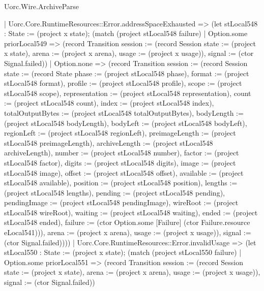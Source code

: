 \begin{lexlean}{Uorc.Wire.ArchiveParse}
\begin{semanticmodule}
{      | Uorc.Core.RuntimeResources::Error.addressSpaceExhausted => (let stLocal548 : State := (project x state); (match (project stLocal548 failure)
        | Option.some priorLocal549 => (record Transition {session := (record Session {state := (project x state), arena := (project x arena), usage := (project x usage)}), signal := (ctor Signal.failed)})
        | Option.none => (record Transition {session := (record Session {state := (record State {phase := (project stLocal548 phase), format := (project stLocal548 format), profile := (project stLocal548 profile), scope := (project stLocal548 scope), representation := (project stLocal548 representation), count := (project stLocal548 count), index := (project stLocal548 index), totalOutputBytes := (project stLocal548 totalOutputBytes), bodyLength := (project stLocal548 bodyLength), bodyLeft := (project stLocal548 bodyLeft), regionLeft := (project stLocal548 regionLeft), preimageLength := (project stLocal548 preimageLength), archiveLength := (project stLocal548 archiveLength), number := (project stLocal548 number), factor := (project stLocal548 factor), digits := (project stLocal548 digits), image := (project stLocal548 image), offset := (project stLocal548 offset), available := (project stLocal548 available), position := (project stLocal548 position), lengths := (project stLocal548 lengths), pending := (project stLocal548 pending), pendingImage := (project stLocal548 pendingImage), wireRoot := (project stLocal548 wireRoot), waiting := (project stLocal548 waiting), ended := (project stLocal548 ended), failure := (ctor Option.some [Failure] (ctor Failure.resource eLocal541))}), arena := (project x arena), usage := (project x usage)}), signal := (ctor Signal.failed)})))
      | Uorc.Core.RuntimeResources::Error.invalidUsage => (let stLocal550 : State := (project x state); (match (project stLocal550 failure)
        | Option.some priorLocal551 => (record Transition {session := (record Session {state := (project x state), arena := (project x arena), usage := (project x usage)}), signal := (ctor Signal.failed)})
}
\end{semanticmodule}
\end{lexlean}
